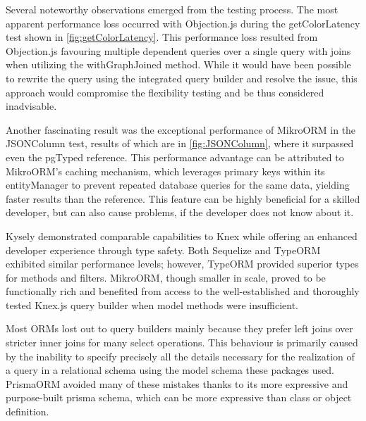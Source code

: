 Several noteworthy observations emerged from the testing process. The most
apparent performance loss occurred with Objection.js during the getColorLatency
test shown in \autoref{fig:getColorLatency}. This performance loss resulted from
Objection.js favouring multiple dependent queries over a single query with joins
when utilizing the withGraphJoined method. While it would have been possible to
rewrite the query using the integrated query builder and resolve the issue, this
approach would compromise the flexibility testing and be thus considered
inadvisable.

Another fascinating result was the exceptional performance of MikroORM in the
JSONColumn test, results of which are in \autoref{fig:JSONColumn}, where it
surpassed even the pgTyped reference. This performance advantage can be
attributed to MikroORM's caching mechanism, which leverages primary keys within
its entityManager to prevent repeated database queries for the same data,
yielding faster results than the reference. This feature can be highly
beneficial for a skilled developer, but can also cause problems, if the
developer does not know about it.

Kysely demonstrated comparable capabilities to Knex while offering an enhanced
developer experience through type safety. Both Sequelize and TypeORM exhibited
similar performance levels; however, TypeORM provided superior types for methods
and filters. MikroORM, though smaller in scale, proved to be functionally rich
and benefited from access to the well-established and thoroughly tested Knex.js
query builder when model methods were insufficient.

Most ORMs lost out to query builders mainly because they prefer left joins over
stricter inner joins for many select operations. This behaviour is primarily
caused by the inability to specify precisely all the details necessary for the
realization of a query in a relational schema using the model schema these
packages used. PrismaORM avoided many of these mistakes thanks to its more
expressive and purpose-built prisma schema, which can be more expressive than
class or object definition.

